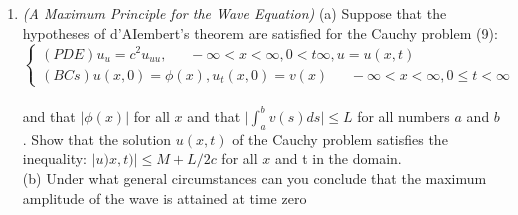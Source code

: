 \documentclass[../main.tex]{subfiles}
\begin{document}
{{\begin{enumerate}
$$\begin{cases}
	0<x<\infty, 0\leqslant t< \infty 
\end{cases}$$
(a)Making use of d'AIembert's formula and an appropriate "method of reflections" technique 
similar to that used in the text for the finite string, develop a program for solving this problem. 
We point out that such a method will not be a numerical method, per se, since it will simply use 
the computer to perform analytical computations (and the only errors are due to roundoff). 
\\
(b) Obtain snapshots of profiles of the solution to the above problem using the following initial conditions:
$\phi(x)=
\begin{cases}
	sin(x) for~~ 0\leqslant x \leqslant2 \pi\\
	0, ~~~~~~~otherwise
\end{cases},
	v(x)=0, c=1$
(c) Obtain snapshots of profiles of the solution to the above problem using the following initial 
conditions:
$$\phi(x)=
\begin{cases}
	sin(x) for~~ 0\leqslant x \leqslant2 \pi\\
	0, ~~~~~~~otherwise
\end{cases},
	v(x)=0
	 \begin{cases}
	 	1,~~for ~~~6\pi \leqslant x 8\pi
	 	0,~~~~~~~otherwise
	 \end{cases}
	 	L=10\pi$$
(d) Create a MATLAB movie of the propagation of the wave in part (b). 
\\
(e) Create a MATLAB movie of the propagation of the wave in part (c).
\\
	\item
		\textit{(A Maximum Principle for the Wave Equation)} (a) Suppose that the hypotheses of d'AIembert's 
theorem are satisfied for the Cauchy problem (9): 
$$\begin{cases} 
	(PDE) u_u=c^2 u_{uu}, ~~~~~~~ - \infty< x< \infty, 0<t \infty , u=u(x,t) \\ 
	(BCs) u(x,0)=\phi (x), u_t(x,0)=v(x) ~~~~~~~
	-\infty< x< \infty, 0\leqslant t< \infty
\end{cases}$$
\\
and that $\vert \phi(x) \vert$  for all $x$ and that $\vert \int_{a}^{b} v(s)ds \vert \leqslant L$ for all numbers $a$ and $b$. Show that the solution $u(x,t)$ of the Cauchy problem satisfies the inequality: $\vert u)x,t) \vert \leqslant M+L/2c$  for all $x$ and t in the domain. 
\\
(b) Under what general circumstances can you conclude that the maximum amplitude of the wave is attained at time zero

\end{enumerate}}}
\end{document}
